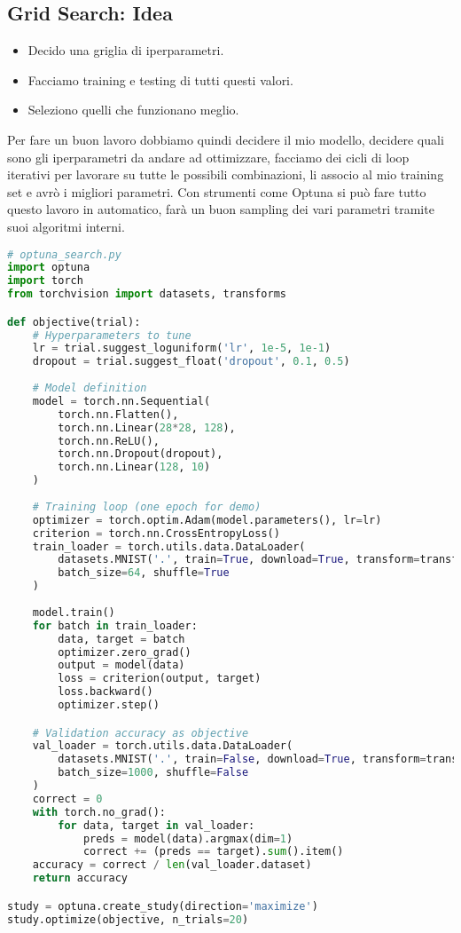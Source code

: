 \documentclass[a4paper,12pt]{article}
\begin{document}
\subsection{Grid Search: Idea} 
\begin{itemize}
    \item Decido una griglia di iperparametri.
    \item Facciamo training e testing di tutti questi valori.
    \item Seleziono quelli che funzionano meglio.
\end{itemize}
Per fare un buon lavoro dobbiamo quindi decidere il mio modello, decidere quali sono gli iperparametri da andare ad ottimizzare, facciamo dei cicli di loop iterativi per lavorare su tutte le possibili combinazioni, li associo al mio training set e avrò i migliori parametri.
Con strumenti come Optuna si può fare tutto questo lavoro in automatico, farà un buon sampling dei vari parametri tramite suoi algoritmi interni. 
\begin{lstlisting}[language=Python, basicstyle=\ttfamily\footnotesize, breaklines=true, frame=single]
# optuna_search.py
import optuna
import torch
from torchvision import datasets, transforms

def objective(trial):
    # Hyperparameters to tune
    lr = trial.suggest_loguniform('lr', 1e-5, 1e-1)
    dropout = trial.suggest_float('dropout', 0.1, 0.5)
    
    # Model definition
    model = torch.nn.Sequential(
        torch.nn.Flatten(),
        torch.nn.Linear(28*28, 128),
        torch.nn.ReLU(),
        torch.nn.Dropout(dropout),
        torch.nn.Linear(128, 10)
    )
    
    # Training loop (one epoch for demo)
    optimizer = torch.optim.Adam(model.parameters(), lr=lr)
    criterion = torch.nn.CrossEntropyLoss()
    train_loader = torch.utils.data.DataLoader(
        datasets.MNIST('.', train=True, download=True, transform=transforms.ToTensor()),
        batch_size=64, shuffle=True
    )
    
    model.train()
    for batch in train_loader:
        data, target = batch
        optimizer.zero_grad()
        output = model(data)
        loss = criterion(output, target)
        loss.backward()
        optimizer.step()

    # Validation accuracy as objective
    val_loader = torch.utils.data.DataLoader(
        datasets.MNIST('.', train=False, download=True, transform=transforms.ToTensor()),
        batch_size=1000, shuffle=False
    )
    correct = 0
    with torch.no_grad():
        for data, target in val_loader:
            preds = model(data).argmax(dim=1)
            correct += (preds == target).sum().item()
    accuracy = correct / len(val_loader.dataset)
    return accuracy

study = optuna.create_study(direction='maximize')
study.optimize(objective, n_trials=20)    
\end{lstlisting}
\end{document}
